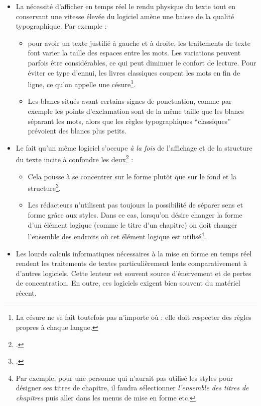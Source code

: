 \begin{itemize}
\item La nécessité d'afficher en temps réel le rendu physique du texte tout en conservant une vitesse élevée du logiciel amène une baisse de la qualité typographique. Par exemple :
	\begin{itemize}
		\item pour avoir un texte justifié à gauche et à droite, les traitements de texte font varier la taille des espaces entre les mots. Les variations peuvent parfois être considérables, ce qui peut diminuer le confort de lecture. Pour éviter ce type d'ennui, les livres classiques coupent les mots en fin de ligne, ce qu'on appelle une césure\footnote{La césure ne se fait toutefois pas n'importe où : elle doit respecter des règles propres à chaque langue.}.
		\item Les blancs situés avant certains signes de ponctuation, comme par exemple les points d'exclamation sont de  la même taille que les blancs séparant les mots, alors que les règles typographiques \enquote{classiques} prévoient des blancs plus petits.
	\end{itemize}
\item Le fait qu'un même logiciel s'occupe \emph{à la fois} de l'affichage et de la structure du texte incite à confondre les deux\footcite[L'auteur de ces lignes est moins sévère envers les traitements de texte que d'autres LaTeXiens : \cf][]{stupide}  :
	\begin{itemize}
		\item Cela pousse à se concentrer sur le forme plutôt que sur le fond et la structure\footcite[Toutefois en théorie la formation universitaire en sciences humaines incite à penser \emph{structure et sens d'abord}. Voir un débat sur le blog de l'auteur :][]{structurevsforme}. 
		\item Les rédacteurs n'utilisent pas toujours la possibilité de séparer sens et forme grâce aux styles. Dans ce cas, lorsqu'on désire changer la forme d'un élément logique (comme  le titre d'un chapitre) on doit changer l'ensemble des endroits où cet élément logique est utilisé\footnote{Par exemple, pour une personne  qui n'aurait pas utilisé les styles pour désigner ses titres de chapitre, il faudra sélectionner \emph{l'ensemble des titres de chapitres} puis aller dans les menus de mise en forme etc.}.
	\end{itemize}

\item Les lourds calculs informatiques nécessaires à la mise en forme en temps réel rendent les traitements de textes particulièrement lents comparativement à d'autres logiciels. Cette lenteur est souvent source d'énervement et de pertes de concentration. En outre, ces logiciels exigent bien souvent du matériel récent.
\end{itemize}

